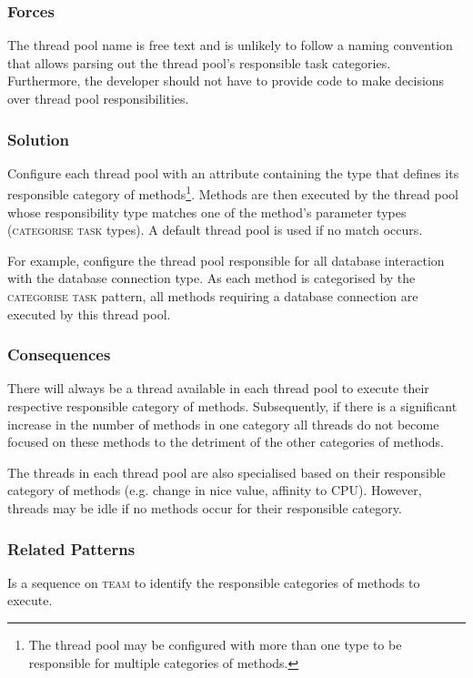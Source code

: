 \documentclass[prodmode]{style/acmlarge}
\begin{document}
\subsubsection*{Forces} The thread pool name is free text and is unlikely to
follow a naming convention that allows parsing out the thread pool's responsible
task categories.  Furthermore, the developer should not have to provide code to
make decisions over thread pool responsibilities.

\subsubsection*{\textbf{Solution}} Configure each thread pool with an attribute
containing the type that defines its responsible category of
methods\footnote{The thread pool may be configured with more than one type to be
responsible for multiple categories of methods.}. Methods are then executed by
the thread pool whose responsibility type matches one of the method's parameter
types (\textsc{categorise task} types).  A default thread pool is used if no
match occurs.

For example, configure the thread pool responsible for all database interaction
with the database connection type.  As each method is categorised by the
\textsc{categorise task} pattern, all methods requiring a database connection
are executed by this thread pool.

\subsubsection*{Consequences} There will always be a thread available in each
thread pool to execute their respective responsible category of methods. 
Subsequently, if there is a significant increase in the number of methods in one
category all threads do not become focused on these methods to the detriment of
the other categories of methods.

The threads in each thread pool are also specialised based on their responsible
category of methods (e.g. change in nice value, affinity to CPU).  However,
threads may be idle if no methods occur for their responsible category.

\subsubsection*{Related Patterns} Is a sequence on \textsc{team} to identify
the responsible categories of methods to execute.
\end{document}

